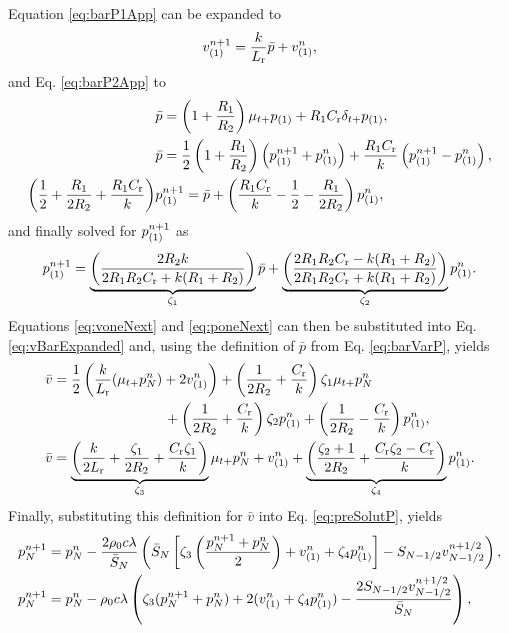 Equation \eqref{eq:barP1App} can be expanded to 
\begin{equation}\label{eq:voneNext}
    v_{(1)}^{n+1} = \frac{k}{L_{\text{r}}}\bar p + v_{(1)}^n ,
\end{equation}
and Eq. \eqref{eq:barP2App} to 
\begin{align*}
    &\bar p =\left(1+\frac{R_1}{R_2}\right)\mu_{t+}p_{(1)}+ R_1 C_{\text{r}}\delta_{t+}p_{(1)},\\
    &\bar p =\frac{1}{2}\left(1+\frac{R_1}{R_2}\right)\left(p_{(1)}^{n+1} + p_{(1)}^n\right) + \frac{R_1C_{\text{r}}}{k}\left(p_{(1)}^{n+1} - p_{(1)}^n\right),\\
    \left(\frac{1}{2}+\frac{R_1}{2R_2} + \frac{R_1C_{\text{r}}}{k}\right)&p_{(1)}^{n+1} = \bar p + \left(\frac{R_1C_{\text{r}}}{k} - \frac{1}{2} - \frac{R_1}{2R_2}\right)p_{(1)}^n,
\end{align*}
and finally solved for $p_{(1)}^{n+1}$ as
\begin{equation}\label{eq:poneNext}
    p_{(1)}^{n+1} = \underbrace{\left(\frac{2R_2k}{2R_1R_2C_{\text{r}} + k(R_1 + R_2)}\right)}_{\zeta_1}\bar p + \underbrace{\left(\frac{2R_1R_2C_{\text{r}} - k(R_1 + R_2)}{2R_1R_2C_{\text{r}} + k(R_1 + R_2)}\right)}_{\zeta_2} p_{(1)}^n .
\end{equation}
Equations \eqref{eq:voneNext} and \eqref{eq:poneNext} can then be substituted into Eq. \eqref{eq:vBarExpanded} and, using the definition of $\bar p$ from Eq. \eqref{eq:barVarP}, yields
\begin{align}
    \bar v &= \frac{1}{2}\left(\frac{k}{L_{\text{r}}}(\mu_{t+}p_N^n) + 2v_{(1)}^n\right)+\left(\frac{1}{2R_2} + \frac{C_{\text{r}}}{k}\right)\zeta_1\mu_{t+}p_N^n\nonumber \\
    & \qquad\qquad\qquad\qquad+ \left(\frac{1}{2R_2} + \frac{C_{\text{r}}}{k}\right)\zeta_2p_{(1)}^n + \left(\frac{1}{2R_2} - \frac{C_{\text{r}}}{k}\right)p_{(1)}^n\nonumber,\\
    \bar v &= \underbrace{\left(\frac{k}{2L_{\text{r}}} + \frac{\zeta_1}{2R_2}+\frac{C_{\text{r}}\zeta_1}{k}\right)}_{\zeta_3}\mu_{t+}p_N^n + v_{(1)}^n + \underbrace{\left(\frac{\zeta_2+1}{2R_2} + \frac{C_{\text{r}}\zeta_2 - C_{\text{r}}}{k}\right)}_{\zeta_4}p_{(1)}^n.
\end{align}
Finally, substituting this definition for $\bar v$ into Eq. \eqref{eq:preSolutP}, yields
\begin{align*}
    p_N^{n+1} &= p_N^n - \frac{2\rho_0c\lambda}{\bar S_N}\left(\bar S_N
    \left[\zeta_3\left(\frac{p_N^{n+1} + p_N^n}{2}\right) + v_{(1)}^n + \zeta_4p_{(1)}^n\right] - S_{N-1/2}v_{N-1/2}^{n+1/2}\right),\\
    p_N^{n+1} &= p_N^n - \rho_0c\lambda\left(\zeta_3(p_N^{n+1} + p_N^n) + 2(v_{(1)}^n + \zeta_4p_{(1)}^n)-\frac{2S_{N-1/2}v_{N-1/2}^{n+1/2}}{\bar S_N}\right),
\end{align*}
